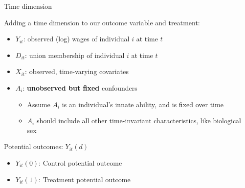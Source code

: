 \documentclass[compress, 8pt]{beamer}
\begin{document}
\begin{frame}{Time dimension}

Adding a time dimension to our outcome variable and treatment:
\begin{itemize}
    \item $Y_{it}$: observed (log) wages of individual $i$ at time $t$
    \item $D_{it}$: union membership of individual $i$ at time $t$
    \item $X_{it}$: observed, time-varying covariates
    \item $A_i$: \textbf{unobserved but fixed} confounders
    \begin{itemize}
         \item Assume $A_i$ is an individual's innate ability, and is fixed over time
         \item $A_i$ should include all other time-invariant characteristics, like biological sex
     \end{itemize}
\end{itemize}
Potential outcomes: $Y_{it}(d)$
\begin{itemize}
    \item $Y_{it} (0)$: Control potential outcome 
    \item $Y_{it} (1)$: Treatment potential outcome
\end{itemize}

\end{frame}
\end{document}
